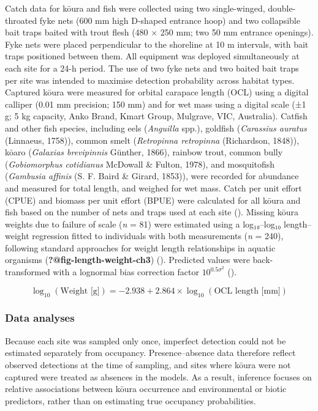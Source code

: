 \documentclass[
  letterpaper,
  DIV=11,
  numbers=noendperiod]{scrartcl}
\begin{document}
Catch data for kōura and fish were collected using two single-winged,
double-throated fyke nets (600 mm high D-shaped entrance hoop) and two
collapsible bait traps baited with trout flesh (480 × 250 mm; two 50 mm
entrance openings). Fyke nets were placed perpendicular to the shoreline
at 10 m intervals, with bait traps positioned between them. All
equipment was deployed simultaneously at each site for a 24-h period.
The use of two fyke nets and two baited bait traps per site was intended
to maximise detection probability across habitat types. Captured kōura
were measured for orbital carapace length (OCL) using a digital calliper
(0.01 mm precision; 150 mm) and for wet mass using a digital scale (±1
g; 5 kg capacity, Anko Brand, Kmart Group, Mulgrave, VIC, Australia).
Catfish and other fish species, including eels (\emph{Anguilla} spp.),
goldfish (\emph{Carassius auratus} (Linnaeus, 1758)), common smelt
(\emph{Retropinna retropinna} (Richardson, 1848)), kōaro (\emph{Galaxias
brevipinnis} Günther, 1866), rainbow trout, common bully
(\emph{Gobiomorphus cotidianus} McDowall \& Fulton, 1978), and
mosquitofish (\emph{Gambusia affinis} (S. F. Baird \& Girard, 1853)),
were recorded for abundance and measured for total length, and weighed
for wet mass. Catch per unit effort (CPUE) and biomass per unit effort
(BPUE) were calculated for all kōura and fish based on the number of
nets and traps used at each site (). Missing kōura weights due to failure of scale (\emph{n} =
81) were estimated using a log₁₀--log₁₀ length--weight regression fitted
to individuals with both measurements (\emph{n} = 240), following
standard approaches for weight length relationships in aquatic organisms
({\textbf{?@fig-length-weight-ch3}}) (). Predicted values were back-transformed with a lognormal bias
correction factor \(10^{0.5 \sigma^2}\) ().

\[
\log_{10}(\text{Weight [g]}) = -2.938 + 2.864 \times \log_{10}(\text{OCL length [mm]})
\]

\subsubsection{Data analyses}\label{data-analyses}

Because each site was sampled only once, imperfect detection could not
be estimated separately from occupancy. Presence--absence data therefore
reflect observed detections at the time of sampling, and sites where
kōura were not captured were treated as absences in the models. As a
result, inference focuses on relative associations between kōura
occurrence and environmental or biotic predictors, rather than on
estimating true occupancy probabilities.
\end{document}
